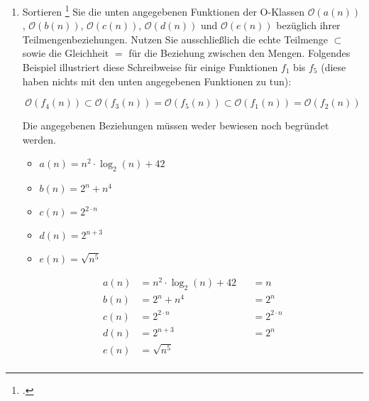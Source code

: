 \documentclass{bschlangaul-aufgabe}
\begin{document}

\begin{enumerate}


\item Sortieren
\footcite{examen:66115:2019:09} Sie die unten angegebenen Funktionen der
O-Klassen $\mathcal{O}(a(n))$, $\mathcal{O}(b(n))$, $\mathcal{O}(c(n))$,
$\mathcal{O}(d(n))$ und $\mathcal{O}(e(n))$ bezüglich ihrer
Teilmengenbeziehungen. Nutzen Sie ausschließlich die echte Teilmenge
$\subset$ sowie die Gleichheit $=$ für die Beziehung zwischen den
Mengen. Folgendes Beispiel illustriert diese Schreibweise für einige
Funktionen $f_1$ bis $f_5$ (diese haben nichts mit den unten angegebenen
Funktionen zu tun):

\begin{displaymath}
\mathcal{O}(f_4 (n)) \subset \mathcal{O}(f_3(n)) = \mathcal{O}(f_5(n)) \subset \mathcal{O}(f_1(n)) = \mathcal{O}(f_2(n))
\end{displaymath}

Die angegebenen Beziehungen müssen weder bewiesen noch begründet werden.

\begin{itemize}
\item $a(n) = n^2 \cdot \log_2(n) + 42$
\item $b(n) = 2^n + n^4$
\item $c(n) = 2^{2 \cdot n}$
\item $d(n) = 2^{n+3}$
\item $e(n) = \sqrt{n^5}$
\end{itemize}

\begin{bAntwort}
\begin{align*}
a(n) &= n^2 \cdot \log_2(n) + 42 &&= n\\
b(n) &= 2^n + n^4 &&= 2^n\\
c(n) &= 2^{2 \cdot n} &&=2^{2 \cdot n}\\
d(n) &= 2^{n+3} &&= 2^n\\
e(n) &= \sqrt{n^5}\\
\end{align*}


\end{bAntwort}
\end{enumerate}
\end{document}

